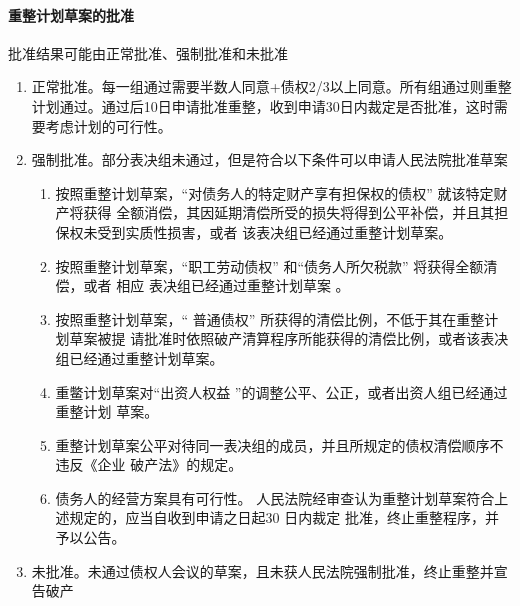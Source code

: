 \documentclass[UTF8,12pt]{ctexart}
\numberwithin{equation}{section} %
\numberwithin{figure}{section}
\numberwithin{table}{section}
\begin{document}
	\paragraph{重整计划草案的批准}
	批准结果可能由正常批准、强制批准和未批准
	\begin{enumerate}
		\item 正常批准。每一组通过需要半数人同意+债权2/3以上同意。所有组通过则重整计划通过。通过后10日申请批准重整，收到申请30日内裁定是否批准，这时需要考虑计划的可行性。
		
		\item 强制批准。部分表决组未通过，但是符合以下条件可以申请人民法院批准草案
		\begin{enumerate}
			\item 按照重整计划草案，“对债务人的特定财产享有担保权的债权” 就该特定财产将获得 全额消偿，其因延期清偿所受的损失将得到公平补偿，并且其担保权未受到实质性损害，或者 该表决组已经通过重整计划草案。
			
			\item 按照重整计划草案，“职工劳动债权” 和“债务人所欠税款” 将获得全额清偿，或者 相应 表决组已经通过重整计划草案 。
			
			\item 按照重整计划草案，“ 普通债权” 所获得的清偿比例，不低于其在重整计划草案被提 请批准时依照破产清算程序所能获得的清偿比例，或者该表决组已经通过重整计划草案。 
			
			\item 重鳖计划草案对“出资人权益 ”的调整公平、公正，或者出资人组已经通过重整计划 草案。
			
			\item 重整计划草案公平对待同一表决组的成员，并且所规定的债权清偿顺序不违反《企业 破产法》的规定。
			
			\item 债务人的经营方案具有可行性。 人民法院经审查认为重整计划草案符合上述规定的，应当自收到申请之日起30 日内裁定 批准，终止重整程序，并予以公告。
		\end{enumerate}
		
		\item 未批准。未通过债权人会议的草案，且未获人民法院强制批准，终止重整并宣告破产
	\end{enumerate}
	
\end{document}
